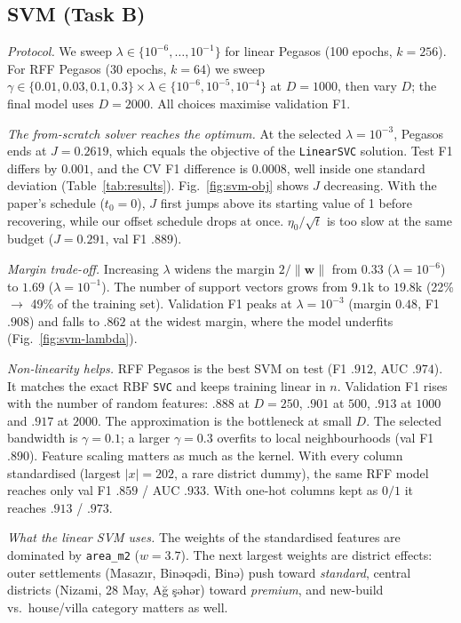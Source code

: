 \documentclass[10pt,twocolumn,a4paper]{article}
\begin{document}
\subsection{SVM (Task B)}\label{sec:svm-results}
\emph{Protocol.} We sweep $\lambda\in\{10^{-6},\dots,10^{-1}\}$ for linear
Pegasos (100 epochs, $k=256$). For RFF Pegasos (30 epochs, $k=64$) we sweep
$\gamma\in\{0.01,0.03,0.1,0.3\}\times\lambda\in\{10^{-6},10^{-5},10^{-4}\}$
at $D=1000$, then vary $D$; the final model uses $D=2000$. All choices
maximise validation F1.

\emph{The from-scratch solver reaches the optimum.} At the selected
$\lambda=10^{-3}$, Pegasos ends at $J=0.2619$, which equals the objective
of the \texttt{LinearSVC} solution. Test F1 differs by $0.001$, and the CV
F1 difference is $0.0008$, well inside one standard deviation
(Table~\ref{tab:results}). Fig.~\ref{fig:svm-obj} shows $J$ decreasing.
With the paper's schedule ($t_0=0$), $J$ first jumps above its starting
value of 1 before recovering, while our offset schedule drops at once.
$\eta_0/\sqrt t$ is too slow at the same budget ($J=0.291$, val F1
$.889$).

\emph{Margin trade-off.} Increasing $\lambda$ widens the margin
$2/\lVert\mathbf{w}\rVert$ from $0.33$ ($\lambda=10^{-6}$) to $1.69$
($\lambda=10^{-1}$). The number of support vectors grows from $9.1$k to
$19.8$k (22\% $\to$ 49\% of the training set). Validation F1 peaks at
$\lambda=10^{-3}$ (margin $0.48$, F1 $.908$) and falls to $.862$ at the
widest margin, where the model underfits (Fig.~\ref{fig:svm-lambda}).

\emph{Non-linearity helps.} RFF Pegasos is the best SVM on test
(F1 $.912$, AUC $.974$). It matches the exact RBF \texttt{SVC} and keeps
training linear in $n$. Validation F1 rises with the number of random
features: $.888$ at $D=250$, $.901$ at $500$, $.913$ at $1000$ and $.917$
at $2000$. The approximation is the bottleneck at small $D$. The selected
bandwidth is $\gamma=0.1$; a larger $\gamma=0.3$ overfits to local
neighbourhoods (val F1 $.890$). Feature scaling matters as much as the
kernel. With every column standardised (largest $|x|=202$, a rare district
dummy), the same RFF model reaches only val F1 $.859$ / AUC $.933$. With
one-hot columns kept as $0/1$ it reaches $.913$ / $.973$.

\emph{What the linear SVM uses.} The weights of the standardised features
are dominated by \texttt{area\_m2} ($w=3.7$). The next largest weights are
district effects: outer settlements (Masazır, Binəqədi, Binə) push toward
\emph{standard}, central districts (Nizami, 28 May, Ağ şəhər) toward
\emph{premium}, and new-build vs.\ house/villa category matters as well.
\end{document}
